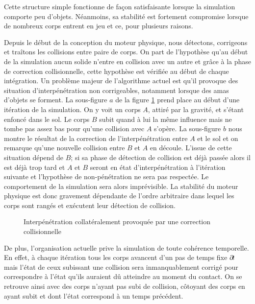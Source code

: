 Cette structure simple fonctionne de façon satisfaisante lorsque la
simulation comporte peu d'objets. Néanmoins, sa stabilité est
fortement compromise lorsque de nombreux corps entrent en jeu et ce,
pour plusieurs raisons.

Depuis le début de la conception du moteur physique, nous détectons,
corrigeons et traîtons les collisions entre paire de corps. On part de
l'hypothèse qu'au début de la simulation aucun solide n'entre en
collision avec un autre et grâce à la phase de correction
collisionnelle, cette hypothèse est vérifiée au début de chaque
intégration. Un problème majeur de l'algorithme actuel est qu'il
provoque des situation d'interpénétration non corrigeables, notamment
lorsque des amas d'objets se forment. La sous-figure $a$ de la figure
\ref{probleme} prend place au début d'une itération de la simulation.
On y voit un corps $A$, attiré par la gravité, et s'étant enfoncé dans
le sol. Le corps $B$ subit quand à lui la même influence mais ne tombe
pas assez bas pour qu'une collision avec $A$ s'opère. La sous-figure
$b$ nous montre le résultat de la correction de l'interpénétration
entre $A$ et le sol et on remarque qu'une nouvelle collision entre $B$
et $A$ en découle. L'issue de cette situation dépend de $B$; si sa
phase de détection de collision est déjà passée alors il est déjà trop
tard et $A$ et $B$ seront en état d'interpénétration à l'itération
suivante et l'hypothèse de non-pénétration ne sera pas respectée. Le
comportement de la simulation sera alors imprévisible. La stabilité du
moteur physique est donc gravement dépendante de l'ordre arbitraire
dans lequel les corps sont rangés et exécutent leur détection de
collision.

\begin{figure}
  \centering
  \subfloat[]{  }
  \subfloat[]{  }
  \caption{Interpénétration collatéralement provoquée par une correction collisionnelle}
  \label{probleme}
\end{figure}

De plus, l'organisation actuelle prive la simulation de toute
cohérence temporelle. En effet, à chaque itération tous les corps
avancent d'un pas de temps fixe $\partial \! t$ mais l'état de ceux
subissant une collision sera inmanquablement corrigé pour correspondre
à l'état qu'ils auraient dû atteindre au moment du contact. On se
retrouve ainsi avec des corps n'ayant pas subi de collision, côtoyant
des corps en ayant subit et dont l'état correspond à un temps
précédent.

